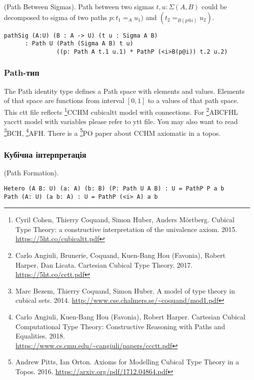 \begin{theorem} (Path Between Sigmas).
Path between two sigmas $t,u: \Sigma(A,B)$ could be decomposed to
sigma of two paths $p:t_1=_{A}u_1)$ and $(t_2=_{B(p@i)}u_2)$.
\begin{lstlisting}
pathSig (A:U) (B : A -> U) (t u : Sigma A B)
      : Path U (Path (Sigma A B) t u)
               ((p: Path A t.1 u.1) * PathP (<i>B(p@i)) t.2 u.2)
\end{lstlisting}
\end{theorem}

\subsubsection{Path-тип}

The Path identity type defines a Path space with elements and values.
Elements of that space are functions from interval $[0,1]$ to a values of that path space.
This ctt file reflects \footnote{Cyril Cohen, Thierry Coquand, Simon Huber, Anders M{\"{o}}rtberg. Cubical Type Theory: a constructive interpretation of the univalence axiom. 2015. \url{https://5ht.co/cubicaltt.pdf}}{CCHM} cubicaltt model with connections.
For \footnote{Carlo Angiuli, Brunerie, Coquand, Kuen-Bang Hou (Favonia), Robert Harper, Dan Licata. Cartesian Cubical Type Theory. 2017. \url{https://5ht.co/cctt.pdf}}{ABCFHL} yacctt model with
variables please refer to ytt file. You may also want to
read \footnote{Marc Bezem, Thierry Coquand, Simon Huber. A model of type theory in cubical sets. 2014. \url{http://www.cse.chalmers.se/~coquand/mod1.pdf}}{BCH},
\footnote{Carlo Angiuli, Kuen-Bang Hou (Favonia), Robert Harper. Cartesian Cubical Computational Type Theory: Constructive Reasoning with Paths and Equalities. 2018. \\ \url{https://www.cs.cmu.edu/~cangiuli/papers/ccctt.pdf}}{AFH}.
There is a \footnote{Andrew Pitts, Ian Orton. Axioms for Modelling Cubical Type Theory in a Topos. 2016. \url{https://arxiv.org/pdf/1712.04864.pdf}}{PO} paper about CCHM axiomatic in a topos.

\subsubsection{Кубічна інтерпретація}

\begin{definition} (Path Formation).
\begin{lstlisting}
Hetero (A B: U) (a: A) (b: B) (P: Path U A B) : U = PathP P a b
Path (A: U) (a b: A) : U = PathP (<i> A) a b
\end{lstlisting}
\end{definition}

